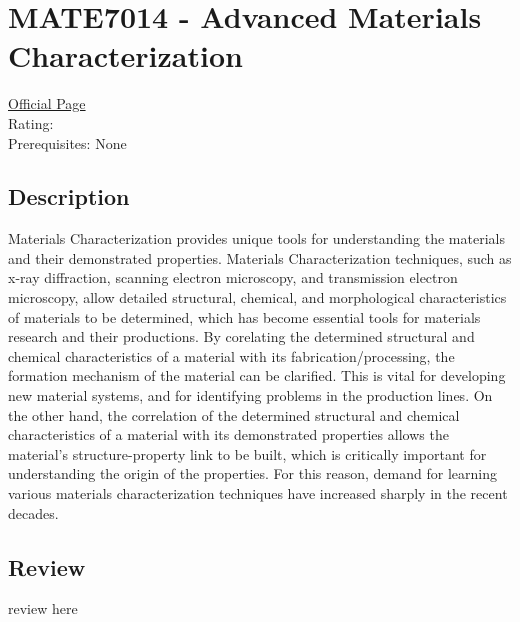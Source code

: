 \hypertarget{MATE7014}{\section{MATE7014 - Advanced Materials Characterization}}

\large
\textcolor{turbo_purple}{\href{https://my.uq.edu.au/programs-courses/course.html?course_code=MATE7014}{Official Page}} \\
Rating: \cstar\cstar\cstar\cstar\ostar \\
Prerequisites: None

\normalsize
\subsection*{Description}
Materials Characterization provides unique tools for understanding the materials and their demonstrated properties.
Materials Characterization techniques, such as x-ray diffraction, scanning electron microscopy, and transmission electron microscopy, allow detailed structural, chemical, and morphological characteristics of materials to be determined, which has become essential tools for materials research and their productions.
By corelating the determined structural and chemical characteristics of a material with its fabrication/processing, the formation mechanism of the material can be clarified.
This is vital for developing new material systems, and for identifying problems in the production lines.
On the other hand, the correlation of the determined structural and chemical characteristics of a material with its demonstrated properties allows the material's structure-property link to be built, which is critically important for understanding the origin of the properties.
For this reason, demand for learning various materials characterization techniques have increased sharply in the recent decades.

\subsection*{Review}
review here

